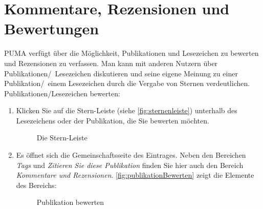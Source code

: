 \section{Kommentare, Rezensionen und Bewertungen}
\label{sec:kommentare}
PUMA verfügt über die Möglichkeit, Publikationen und Lesezeichen zu bewerten und Rezensionen zu verfassen. Man kann mit anderen Nutzern über Publikationen/~Lesezeichen diskutieren und seine eigene Meinung zu einer Publikation/~einem Lesezeichen durch die Vergabe von Sternen verdeutlichen.
\newline
\newline
Publikationen/Lesezeichen bewerten:
\begin{enumerate}
    \item Klicken Sie auf die Stern-Leiste (siehe \autoref{fig:sternenleiste}) unterhalb des Lesezeichens oder der Publikation, die Sie bewerten möchten.
\begin{figure}[h!]
 \centering
 \caption{Die Stern-Leiste}
 \label{fig:sternenleiste}
\end{figure}  
    \item Es öffnet sich die Gemeinschaftsseite des Eintrages. Neben den Bereichen \textit{Tags} und \textit{Zitieren Sie diese Publikation} finden Sie hier auch den Bereich \textit{Kommentare und Rezensionen}. \autoref{fig:publikationBewerten} zeigt die Elemente des Bereichs:
\begin{figure}[h!]
 \centering
 \caption{Publikation bewerten}

\end{figure}
\end{enumerate}
